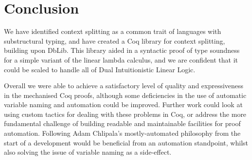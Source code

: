 \documentclass[]{unswthesis}
\begin{document}








\chapter{Conclusion}

We have identified context splitting as a common trait of languages with substructural typing, and have created a Coq library for context splitting, building upon DbLib. This library aided in a syntactic proof of type soundness for a simple variant of the linear lambda calculus, and we are confident that it could be scaled to handle all of Dual Intuitionistic Linear Logic.

Overall we were able to achieve a satisfactory level of quality and expressiveness in the mechanised Coq proofs, although some deficiencies in the use of automatic variable naming and automation could be improved. Further work could look at using custom tactics for dealing with these problems in Coq, or address the more fundamental challenge of building readable and maintainable facilities for proof automation. Following Adam Chlipala's mostly-automated philosophy from the start of a development would be beneficial from an automation standpoint, whilst also solving the issue of variable naming as a side-effect.
\end{document}

